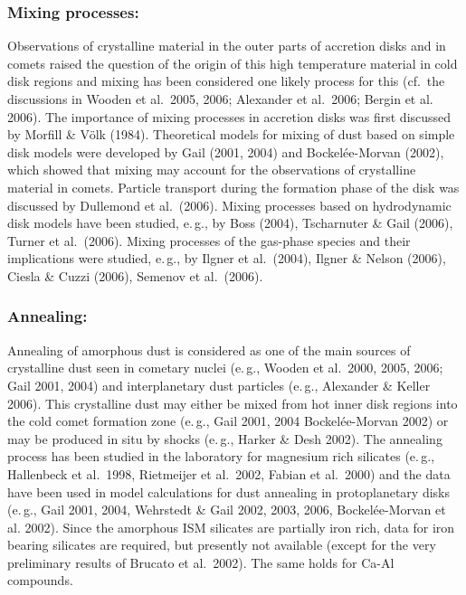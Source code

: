 \subsubsection{Mixing processes:}
Observations of crystalline material in the outer parts of
accretion disks and in comets raised the question of the origin of
this high temperature material in cold disk regions and mixing has
been considered one likely process for this (cf.\ the discussions
in Wooden et al.~2005, 2006; Alexander et al.~2006; Bergin et al.
2006). The importance of mixing processes in accretion disks was
first discussed by Morfill \& V\"olk (1984). Theoretical models for
mixing of dust based on simple disk models were developed by Gail
(2001, 2004) and Bockel{\'e}e-Morvan (2002), which showed that
mixing may account for the observations of crystalline material in
comets. Particle transport during the formation phase of the disk
was discussed by Dullemond et al.~(2006). Mixing processes based
on hydrodynamic disk models have been studied, e.\,g., by Boss
(2004), Tscharnuter \& Gail (2006), Turner et al.~(2006). Mixing
processes of the gas-phase species and their implications were
studied, e.\,g., by Ilgner et al.~(2004), Ilgner \& Nelson (2006),
Ciesla \& Cuzzi (2006), Semenov et al.~(2006).

\subsubsection{Annealing:}
Annealing of amorphous dust is considered as one of the main
sources of crystalline dust seen in cometary nuclei (e.\,g.,
Wooden et al.~2000, 2005, 2006; Gail 2001, 2004) and
interplanetary dust particles (e.\,g., Alexander \& Keller 2006).
This crystalline dust may either be mixed from hot inner disk
regions into the cold comet formation zone (e.\,g., Gail 2001,
2004 Bockel{\'e}e-Morvan 2002) or may be produced in situ by
shocks (e.\,g., Harker \& Desh 2002). The annealing process has
been studied in the laboratory for magnesium rich silicates
(e.\,g., Hallenbeck et al.~1998, Rietmeijer et al.~2002, Fabian et
al.~2000) and the data have been used in model calculations for
dust annealing in protoplanetary disks (e.\,g., Gail 2001, 2004,
Wehrstedt \& Gail 2002, 2003, 2006, Bockel{\'e}e-Morvan et al.
2002). Since the amorphous ISM silicates are partially iron rich,
data for iron bearing silicates are required, but presently not
available (except for the very preliminary results of Brucato et
al.~2002). The same holds for Ca-Al compounds.

